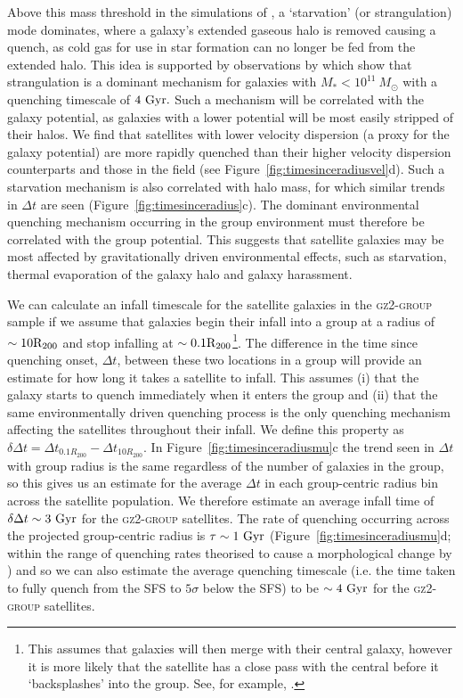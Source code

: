 \documentclass[useAMS,usenatbib]{mn2e}
\begin{document}
Above this mass threshold in the simulations of \cite{fillingham16}, a `starvation' (or strangulation) mode \citep{larson80, balogh00} dominates, where a galaxy's extended gaseous halo is removed causing a quench, as cold gas for use in star formation can no longer be fed from the extended halo. This idea is supported by observations by \citet{peng10} which show that strangulation is a dominant mechanism for galaxies with $M_* < 10^{11}~M_{\odot}$ with a quenching timescale of $4~\rm{Gyr}.$ Such a mechanism will be correlated with the galaxy potential, as galaxies with a lower potential will be most easily stripped of their halos. We find that satellites with lower velocity dispersion (a proxy for the galaxy potential) are more rapidly quenched than their higher velocity dispersion counterparts and those in the field (see Figure~\ref{fig:timesinceradiusvel}d). Such a starvation mechanism is also correlated with halo mass, for which similar trends in $\Delta t$ are seen (Figure~\ref{fig:timesinceradius}c). The dominant environmental quenching mechanism occurring in the group environment must therefore be correlated with the group potential. This suggests that satellite galaxies may be most affected by gravitationally driven environmental effects, such as starvation, thermal evaporation of the galaxy halo and galaxy harassment. 


We can calculate an infall timescale for the satellite galaxies in the \textsc{gz2-group} sample if we assume that galaxies begin their infall into a group at a radius of $\sim10\rm{R}_{200}$ and stop infalling at $\sim0.1\rm{R}_{200}$\footnote{This assumes that galaxies will then merge with their central galaxy, however it is more likely that the satellite has a close pass with the central before it `backsplashes' into the group. See, for example, \cite{pimbblet11}.}. The difference in the time since quenching onset, $\Delta t$, between these two locations in a group will provide an estimate for how long it takes a satellite to infall. This assumes (i) that the galaxy starts to quench immediately when it enters the group and (ii) that the same environmentally driven quenching process is the only quenching mechanism affecting the satellites throughout their infall. We define this property as $\delta \Delta t = \Delta t_{0.1R_{200}} - \Delta t_{10 R_{200}}$. In Figure~\ref{fig:timesinceradiusmu}c the trend seen in $\Delta t$ with group radius is the same regardless of the number of galaxies in the group, so this gives us an estimate for the average $\Delta t$ in each group-centric radius bin across the satellite population. We therefore estimate an average infall time of $\delta \Delta t \sim 3 ~\rm{Gyr}$ for the \textsc{gz2-group} satellites. The rate of quenching occurring across the projected group-centric radius is $\tau \sim 1~\rm{Gyr}$ (Figure~\ref{fig:timesinceradiusmu}d; within the range of quenching rates theorised to cause a morphological change by \citealt{smethurst15}) and so we can also estimate the average quenching timescale (i.e. the time taken to fully quench from the SFS to $5\sigma$ below the SFS) to be $\sim 4~\rm{Gyr}$ for the \textsc{gz2-group} satellites.
\end{document}
